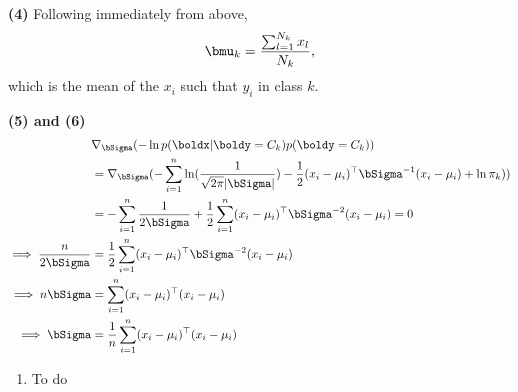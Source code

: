 \documentclass[submit]{harvardml}
\begin{document}
\medskip

\noindent\textbf{(4)} Following immediately from above,
$$ \bmu_k = \frac{\sum_{l=1}^{N_k} x_l}{N_k},$$
which is the mean of the $x_i$ such that $y_i$ in class $k$.

\bigskip

\noindent\textbf{(5) and (6)}
\begin{align*}
&\nabla_\bSigma( -\ln p(\boldx|\boldy = C_k)p(\boldy = C_k)) \\
&= \nabla_\bSigma (-\sum_{i=1}^n \ln( \frac{1}{\sqrt{2\pi}|\bSigma|}) -\frac{1}{2} (x_i-\mu_i)^\top \bSigma^{-1}(x_i-\mu_i) +\ln \pi_k ))\\
&= -\sum_{i=1}^n  \frac{1}{2\bSigma} +  \frac{1}{2}\sum_{i=1}^n (x_i - \mu_i)^\top \bSigma^{-2} (x_i - \mu_i) = 0\\
\implies \frac{n}{2\bSigma} &= \frac{1}{2} \sum_{i=1}^n(x_i - \mu_i)^\top \bSigma^{-2} (x_i - \mu_i) \\
\implies n \bSigma &= \sum_{i=1}^n(x_i - \mu_i)^\top  (x_i - \mu_i) \\
\implies \bSigma &= \frac{1}{n}\sum_{i=1}^n(x_i - \mu_i)^\top  (x_i - \mu_i)
\end{align*}


\begin{solution}
\begin{sol}
\begin{enumerate}
\item To do
\end{enumerate}
\end{sol}
\end{solution}







\newpage
\end{document}
